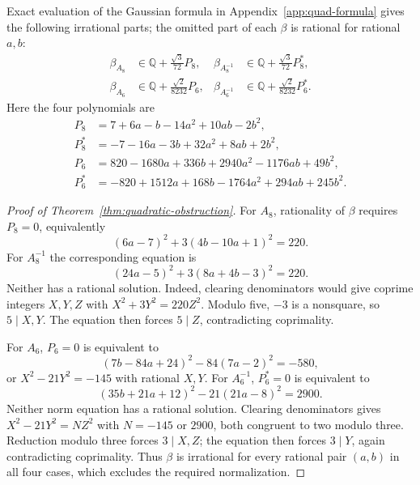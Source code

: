 \documentclass[11pt,reqno]{amsart}
\theoremstyle{remark}
\numberwithin{equation}{section}
\newcommand{\QQ}{\mathbb Q}
\begin{document}
Exact evaluation of the Gaussian formula in Appendix~\ref{app:quad-formula}
gives the following irrational parts; the omitted part of each $\beta$
is rational for rational $a,b$:
\begin{align*}
 \beta_{A_8}&\in\QQ+\frac{\sqrt3}{72}P_8,&
 \beta_{A_8^{-1}}&\in\QQ+\frac{\sqrt3}{72}P_8^*,\\
 \beta_{A_6}&\in\QQ+\frac{\sqrt2}{8232}P_6,&
 \beta_{A_6^{-1}}&\in\QQ+\frac{\sqrt2}{8232}P_6^*.
\end{align*}
Here the four polynomials are
\begin{align}
 P_8&=7+6a-b-14a^2+10ab-2b^2,\label{eq:qob-p8}\\
 P_8^*&=-7-16a-3b+32a^2+8ab+2b^2,\label{eq:qob-p8dual}\\
 P_6&=820-1680a+336b+2940a^2-1176ab+49b^2,\label{eq:qob-p6a}\\
 P_6^*&=-820+1512a+168b-1764a^2+294ab+245b^2.\label{eq:qob-p6dual}
\end{align}
\begin{proof}[Proof of Theorem~\ref{thm:quadratic-obstruction}]
For $A_8$, rationality of $\beta$ requires $P_8=0$, equivalently
\[
 (6a-7)^2+3(4b-10a+1)^2=220.
\]
For $A_8^{-1}$ the corresponding equation is
\[
 (24a-5)^2+3(8a+4b-3)^2=220.
\]
Neither has a rational solution. Indeed, clearing denominators would give
coprime integers $X,Y,Z$ with $X^2+3Y^2=220Z^2$. Modulo five,
$-3$ is a nonsquare, so $5\mid X,Y$. The equation then forces $5\mid Z$,
contradicting coprimality.

For $A_6$, $P_6=0$ is equivalent to
\[
 (7b-84a+24)^2-84(7a-2)^2=-580,
\]
or $X^2-21Y^2=-145$ with rational $X,Y$. For $A_6^{-1}$, $P_6^*=0$
is equivalent to
\[
 (35b+21a+12)^2-21(21a-8)^2=2900.
\]
Neither norm equation has a rational solution. Clearing denominators
gives $X^2-21Y^2=NZ^2$ with $N=-145$ or $2900$, both congruent to two
modulo three. Reduction modulo three forces $3\mid X,Z$; the equation
then forces $3\mid Y$, again contradicting coprimality.
Thus $\beta$ is irrational for every rational pair $(a,b)$ in all four
cases, which excludes the required normalization.
\end{proof}
\end{document}
